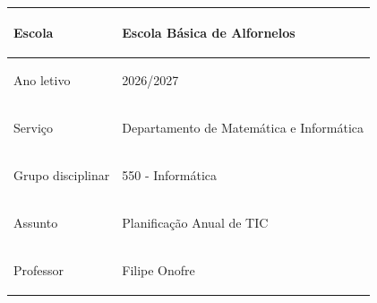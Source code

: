 \documentclass[11pt,a4paper]{article}
\begin{document}
\CabecalhoAlfornelos


\renewcommand{\arraystretch}{1.2}

\begin{tabularx}{\textwidth}{|>{\bfseries\raggedright\arraybackslash}p{3.5cm}|X|}
\hline
Escola & Escola Básica de Alfornelos \\
\hline
Ano letivo & 2026/2027 \\
\hline
Serviço & Departamento de Matemática e Informática \\
\hline
Grupo disciplinar & 550 - Informática \\
\hline
Assunto & Planificação Anual de TIC \\
\hline
Professor & Filipe Onofre\\
\hline
\end{tabularx}
\end{document}
